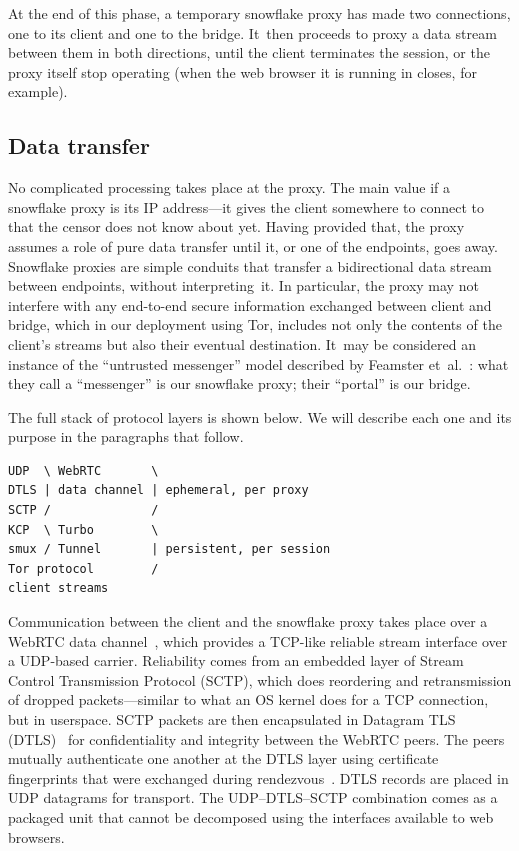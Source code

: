 \documentclass[letterpaper,twocolumn]{article}
\begin{document}
At the end of this phase,
a temporary snowflake proxy has made two connections,
one to its client and one to the bridge.
It~then proceeds to proxy a data stream between them
in both directions,
until the client terminates the session,
or the proxy itself stop operating
(when the web browser it is running in closes, for example).

\subsection{Data transfer}
\label{sec:data-transfer}

No complicated processing takes place at the proxy.
The main value if a snowflake proxy is its IP address---it
gives the client somewhere to connect to that the censor does not know about yet.
Having provided that, the proxy assumes a role
of pure data transfer until it, or one of the endpoints, goes away.
Snowflake proxies are simple conduits that transfer
a bidirectional data stream between endpoints,
without interpreting~it.
In particular, the proxy may not interfere with any
end-to-end secure information exchanged between client and bridge,
which in our deployment using Tor,
includes not only the contents of the client's streams
but also their eventual destination.
It~may be considered an instance of the
``untrusted messenger'' model described by
Feamster et~al.~\cite[\S 3]{Feamster2003a}:
what they call a ``messenger'' is our snowflake proxy;
their ``portal'' is our bridge.

The full stack of protocol layers is shown below.
We will describe each one and its purpose
in the paragraphs that follow.

\begin{verbatim}
UDP  \ WebRTC       \
DTLS | data channel | ephemeral, per proxy
SCTP /              /
KCP  \ Turbo        \
smux / Tunnel       | persistent, per session
Tor protocol        /
client streams
\end{verbatim}

Communication between the client and the snowflake proxy
takes place over
a WebRTC data channel~\cite{rfc8831}, which
provides a TCP-like
reliable stream interface over a UDP-based carrier.
Reliability comes from an embedded layer of
Stream Control Transmission Protocol (SCTP), which
does reordering and retransmission of dropped packets---similar
to what an OS kernel does for a TCP connection,
but in userspace.
SCTP packets are then encapsulated in Datagram TLS (DTLS)~\cite{rfc9147}
for confidentiality and integrity between the WebRTC peers.
The peers mutually authenticate one another
at the DTLS layer using certificate fingerprints
that were exchanged during rendezvous~\cite[\S 5.1]{rfc8842}.
DTLS records are placed in UDP datagrams for transport.
The UDP--DTLS--SCTP combination comes as a packaged unit
that cannot be decomposed using the interfaces available to web browsers.
\end{document}
